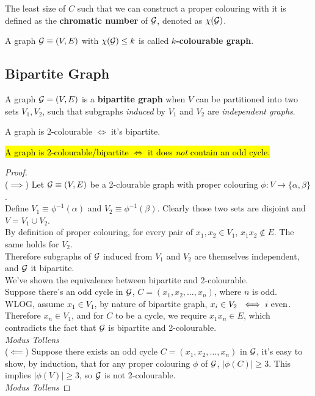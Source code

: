 \documentclass{article}
\begin{document}
			\begin{definition}
				The least size of $C$ such that we can construct a proper colouring with it is defined as the \textbf{chromatic number} of $\mathcal{{G}}$, denoted as $\chi(\mathcal{{G}})$.
			\end{definition}
			
			\begin{definition}
				A graph $\mathcal{{G}} \equiv (V, E)$ with $\chi(\mathcal{{G}}) \leq k$ is called \textbf{$k$-colourable graph}.
			\end{definition}
			
		\subsection{Bipartite Graph}
			\begin{definition}
				A graph $\mathcal{{G}} = (V, E)$ is a \textbf{bipartite graph} when $V$ can be partitioned into two sets $V_1, V_2$, such that subgraphs \emph{induced} by $V_1$ and $V_2$ are \emph{independent graphs}.
			\end{definition}
			
			\begin{theorem}
				A graph is 2-colourable $\iff$ it's bipartite.
			\end{theorem}
			
			\begin{theorem}
				\hl{A graph is 2-colourable/bipartite $\iff$ it does \emph{not} contain an odd cycle.}
			\end{theorem}
			\begin{proof}\quad \\
				($\implies$) Let $\mathcal{{G}} \equiv (V, E)$ be a 2-clourable graph with proper colouring $\phi: V \to \{\alpha, \beta\}$. \\
				Define $V_1 \equiv \phi^{-1}(\alpha)$ and $V_2 \equiv \phi^{-1}(\beta)$. Clearly those two sets are disjoint and $V = V_1 \cup V_2$. \\
				By definition of proper colouring, for every pair of $x_1, x_2 \in V_1$, $x_1 x_2 \notin E$. The same holds for $V_2$. \\
				Therefore subgraphs of $\mathcal{{G}}$ induced from $V_1$ and $V_2$ are themselves independent, and $\mathcal{{G}}$ it bipartite. \\
				We've shown the equivalence between bipartite and 2-colourable. \\
				Suppose there's an odd cycle in $\mathcal{{G}}$, $C = (x_1, x_2, \dots, x_n)$, where $n$ is odd. \\
				WLOG, assume $x_1 \in V_1$, by nature of bipartite graph, $x_i \in V_2\ \iff i \tx{ even}$. Therefore $x_n \in V_1$, and for $C$ to be a cycle, we require $x_1 x_n \in E$, which contradicts the fact that $\mathcal{{G}}$ is bipartite and 2-colourable. \\\emph{Modus Tollens} \\
				($\impliedby$) Suppose there exists an odd cycle $C = (x_1, x_2, \dots, x_n)$ in $\mathcal{{G}}$, it's easy to show, by induction,  that for any proper colouring $\phi$ of $\mathcal{{G}}$, $|\phi(C)| \geq 3$. This implies $|\phi(V)| \geq 3$, so $\mathcal{{G}}$ is not 2-colourable. \\
				\emph{Modus Tollens}
			\end{proof}
			
\end{document}
